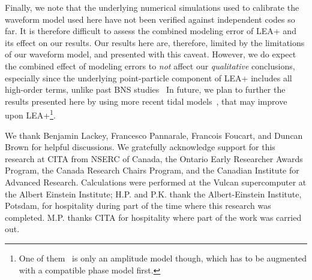 \documentclass[aps,prd,amsmath,floats,floatfix, twocolumn,
superscriptaddress,nofootinbib,showpacs]{revtex4-1}
\begin{document}
Finally, we note that the underlying numerical simulations used to calibrate
the waveform model used here have not been verified against
independent codes so far.
% 
It is therefore difficult to assess the combined modeling error of LEA+ and its
effect
on our results. Our results here are, therefore, limited by the limitations of
our waveform model, and presented with this caveat. However, we do expect the
combined effect of modeling errors to {\it not} affect our {\it qualitative}
conclusions, especially since the underlying point-particle component of LEA+
includes all high-order terms, unlike past BNS studies~\cite{Lackey2014,
Wade:2014vqa}
% 
In future, we plan to further the results presented here by using more recent
tidal models~\cite{Pannarale:2015jka,Hinderer:2016eia}, that
may improve upon LEA+\footnote{One of them~\cite{Pannarale:2015jka} is only an
amplitude model though, which has to be augmented with a compatible phase model
first.}.




\begin{acknowledgments}
  We thank Benjamin Lackey, Francesco Pannarale, Francois Foucart, and Duncan Brown
  for helpful discussions. We gratefully acknowledge support
  for this research at CITA from NSERC of Canada, the Ontario Early 
  Researcher Awards Program, the Canada Research
  Chairs Program, and the Canadian Institute for Advanced Research.
  Calculations were performed at the Vulcan
  supercomputer at the Albert Einstein Institute;
  H.P. and P.K. thank the Albert-Einstein Institute,
  Potsdam, for hospitality during part of the time where this research
  was completed. M.P. thanks CITA for hospitality where part of the work
  was carried out.
\end{acknowledgments}
\end{document}
